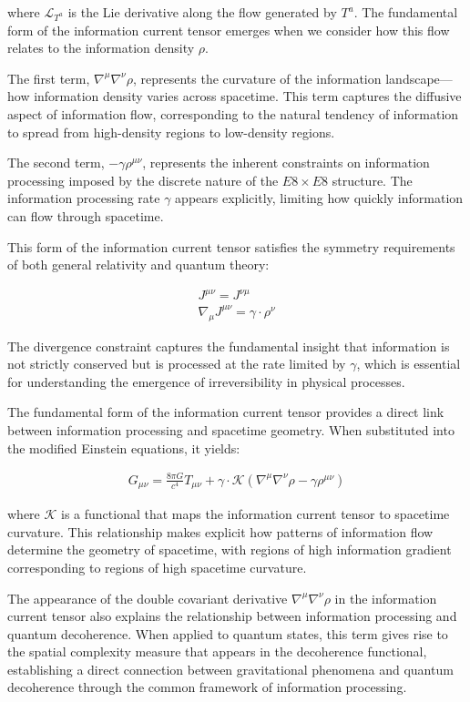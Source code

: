 \documentclass[11pt,english,twoside]{article}
\begin{document}
where $\mathcal{L}_{T^a}$ is the Lie derivative along the flow generated by $T^a$. The fundamental form of the information current tensor emerges when we consider how this flow relates to the information density $\rho$.

The first term, $\nabla^{\mu}\nabla^{\nu}\rho$, represents the curvature of the information landscape—how information density varies across spacetime. This term captures the diffusive aspect of information flow, corresponding to the natural tendency of information to spread from high-density regions to low-density regions.

The second term, $-\gamma\rho^{\mu\nu}$, represents the inherent constraints on information processing imposed by the discrete nature of the $E8\times E8$ structure. The information processing rate $\gamma$ appears explicitly, limiting how quickly information can flow through spacetime.

This form of the information current tensor satisfies the symmetry requirements of both general relativity and quantum theory:

\begin{align}
    J^{\mu\nu} = J^{\nu\mu} \\
    \nabla_{\mu}J^{\mu\nu} = \gamma \cdot \rho^{\nu}
\end{align}

The divergence constraint captures the fundamental insight that information is not strictly conserved but is processed at the rate limited by $\gamma$, which is essential for understanding the emergence of irreversibility in physical processes.

The fundamental form of the information current tensor provides a direct link between information processing and spacetime geometry. When substituted into the modified Einstein equations, it yields:

\begin{align}
    G_{\mu\nu} = \frac{8\pi G}{c^4}T_{\mu\nu} + \gamma \cdot \mathcal{K}(\nabla^{\mu}\nabla^{\nu}\rho - \gamma\rho^{\mu\nu})
\end{align}

where $\mathcal{K}$ is a functional that maps the information current tensor to spacetime curvature. This relationship makes explicit how patterns of information flow determine the geometry of spacetime, with regions of high information gradient corresponding to regions of high spacetime curvature.

The appearance of the double covariant derivative $\nabla^{\mu}\nabla^{\nu}\rho$ in the information current tensor also explains the relationship between information processing and quantum decoherence. When applied to quantum states, this term gives rise to the spatial complexity measure that appears in the decoherence functional, establishing a direct connection between gravitational phenomena and quantum decoherence through the common framework of information processing.
\end{document}
